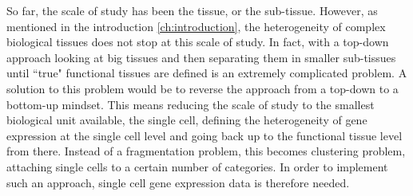 	So far, the scale of study has been the tissue, or the sub-tissue. However, as mentioned in the introduction \ref{ch:introduction}, the heterogeneity of complex biological tissues does not stop at this scale of study. In fact, with a top-down approach looking at big tissues and then separating them in smaller sub-tissues until ``true" functional tissues are defined is an extremely complicated problem. A solution to this problem would be to reverse the approach from a top-down to a bottom-up mindset. This means reducing the scale of study to the smallest biological unit available, the single cell, defining the heterogeneity of gene expression at the single cell level and going back up to the functional tissue level from there. Instead of a fragmentation problem, this becomes clustering problem, attaching single cells to a certain number of categories. In order to implement such an approach, single cell gene expression data is therefore needed.

%
%
%
%
%



